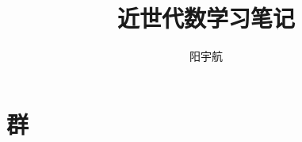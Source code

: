 \documentclass[12pt]{ctexart}
\title{近世代数学习笔记}
\author{阳宇航}
\date{}
\theoremstyle{oneline}
\theoremstyle{twoline}
\begin{document}
 
\maketitle
\tableofcontents
\newpage

\section{群}
\end{document}
